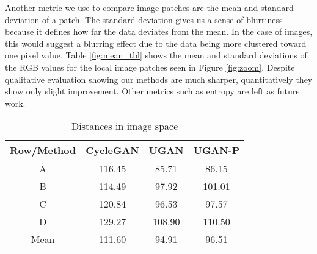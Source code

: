 Another metric we use to compare image patches are the mean and standard deviation of a patch. The standard deviation gives us a 
sense of blurriness because it defines how far the data deviates from the mean. In 
the case of images, this would suggest a blurring effect due to the data being more clustered toward one pixel value. Table 
\ref{fig:mean_tbl} shows the mean and standard deviations of the RGB values for the local image patches seen in Figure 
\ref{fig:zoom}. Despite qualitative evaluation showing our methods are much sharper, quantitatively they show only slight 
improvement. Other metrics such as entropy are left as future work.

\begin{table}
\centering
\caption{Distances in image space}
\begin{tabular}{| c | c | c | c |}
   \hline
   Row/Method & CycleGAN & \textbf{UGAN} & \textbf{UGAN-P} \\ \hline
   A          & 116.45 & 85.71  & 86.15  \\ \hline
   B          & 114.49 & 97.92  & 101.01 \\ \hline
   C          & 120.84 & 96.53  & 97.57  \\ \hline
   D          & 129.27 & 108.90 & 110.50 \\ \hline
   Mean       & 111.60 & 94.91  & 96.51 \\ \hline
\end{tabular}
\label{tab:one}
\end{table}



